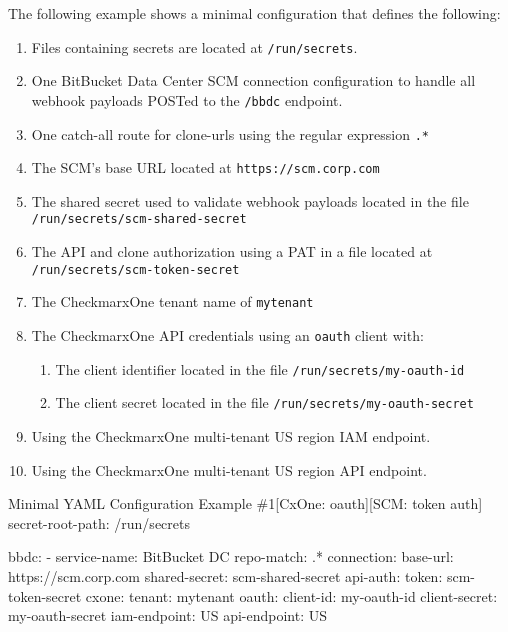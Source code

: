 The following example shows a minimal \cxoneflow configuration that defines the following:

\begin{enumerate}
    \item Files containing secrets are located at \texttt{/run/secrets}.
    \item One BitBucket Data Center SCM connection configuration to handle all webhook payloads
    POSTed to the \texttt{/bbdc} endpoint.
    \item One catch-all route for clone-urls using the regular expression \texttt{.*}
    \item The SCM's base URL located at \texttt{https://scm.corp.com}
    \item The shared secret used to validate webhook payloads located in the file \texttt{/run/secrets/scm-shared-secret}
    \item The API and clone authorization using a PAT in a file located at \texttt{/run/secrets/scm-token-secret}
    \item The CheckmarxOne tenant name of \texttt{mytenant}
    \item The CheckmarxOne API credentials using an \texttt{oauth} client with:
    \begin{enumerate}
        \item The client identifier located in the file \texttt{/run/secrets/my-oauth-id}
        \item The client secret located in the file \texttt{/run/secrets/my-oauth-secret}
    \end{enumerate}
    \item Using the CheckmarxOne multi-tenant US region IAM endpoint.
    \item Using the CheckmarxOne multi-tenant US region API endpoint.
\end{enumerate}

\begin{code}{Minimal YAML Configuration Example \#1}{[CxOne: oauth]}{[SCM: token auth]}
secret-root-path: /run/secrets

bbdc:
    - service-name: BitBucket DC
      repo-match: .*
      connection:
        base-url: https://scm.corp.com
        shared-secret: scm-shared-secret
        api-auth:
            token: scm-token-secret
      cxone:
        tenant: mytenant
        oauth:
            client-id: my-oauth-id
            client-secret: my-oauth-secret
        iam-endpoint: US
        api-endpoint: US
\end{code}

